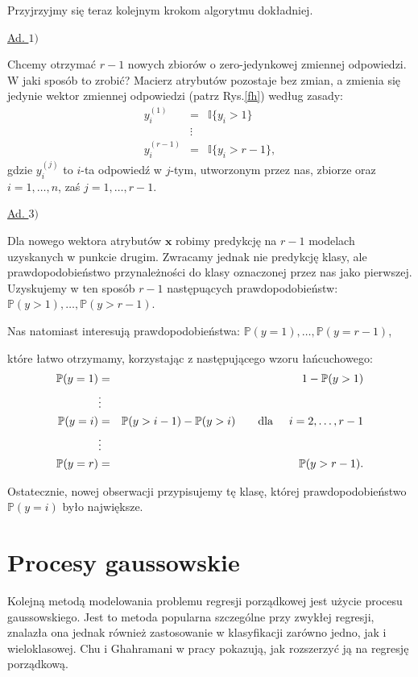 \documentclass{mini}
\begin{document}
Przyjrzyjmy się teraz kolejnym krokom algorytmu dokładniej.

\underline{Ad. $1)$}

Chcemy otrzymać $r-1$ nowych zbiorów o zero-jedynkowej zmiennej odpowiedzi. W jaki sposób to zrobić?
Macierz atrybutów pozostaje bez zmian, a zmienia się jedynie wektor zmiennej odpowiedzi (patrz Rys.\ref{fh}) według zasady:
\begin{eqnarray*}
y_i^{(1)} &=& \mathbb{I}\lbrace y_i>1 \rbrace\\
&\vdots& \\
y_i^{(r-1)} &=& \mathbb{I}\lbrace y_i>r-1 \rbrace,
\end{eqnarray*}
gdzie $y_i^{(j)}$ to $i$-ta odpowiedź w $j$-tym, utworzonym przez nas, zbiorze oraz $i=1,\ldots,n$, zaś $j=1,\ldots, r-1$. 

\underline{Ad. $3)$}

Dla nowego wektora atrybutów $\textbf{x}$ robimy predykcję na $r-1$ modelach uzyskanych w punkcie drugim. Zwracamy jednak nie predykcję klasy, ale prawdopodobieństwo przynależności do klasy oznaczonej przez nas jako pierwszej. Uzyskujemy w ten sposób $r-1$ następuących prawdopodobieństw: $\mathbb{P}(y > 1), \ldots, \mathbb{P}(y > r-1)$.

Nas natomiast interesują prawdopodobieństwa: $\mathbb{P}(y = 1), \ldots, \mathbb{P}(y = r-1)$,

które łatwo otrzymamy, korzystając z następującego wzoru łańcuchowego:
\begin{eqnarray*}
\mathbb{P}(y = 1) &=& 1 - \mathbb{P}(y > 1)\\
&\vdots& \\
\mathbb{P}(y = i) &=& \mathbb{P}(y > i-1) - \mathbb{P}(y > i) \qquad \text{dla}\hspace{5mm} i=2, \ldots, r-1\\
&\vdots& \\
\mathbb{P}(y = r) &=& \mathbb{P}(y > r-1).\\
\end{eqnarray*}

Ostatecznie, nowej obserwacji przypisujemy tę klasę, której prawdopodobieństwo $\mathbb{P}(y=i)$ było największe.

\section{Procesy gaussowskie}

Kolejną metodą modelowania problemu regresji porządkowej jest użycie procesu gaussowskiego. Jest to metoda popularna szczególne przy zwykłej regresji, znalazła ona jednak również zastosowanie w klasyfikacji zarówno jedno, jak i wieloklasowej. Chu i Ghahramani w pracy \cite{reg} pokazują, jak rozszerzyć ją na regresję porządkową. 
\end{document}
